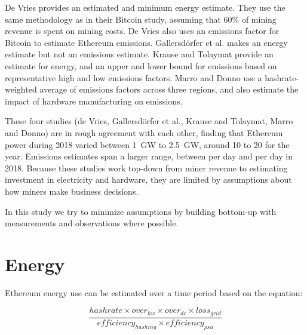 De Vries provides an estimated and minimum energy estimate. They use the same methodology as in their Bitcoin study, assuming that 60\% of mining revenue is spent on mining costs. De Vries also uses an emissions factor for Bitcoin to estimate Ethereum emissions. Gallersdörfer et al. makes an energy estimate but not an emissions estimate. Krause and Tolaymat provide an estimate for energy, and an upper and lower bound for emissions based on representative high and low emissions factors. Marro and Donno use a hashrate-weighted average of emissions factors across three regions, and also estimate the impact of hardware manufacturing on emissions.

These four studies (de Vries, Gallersdörfer et al., Krause and Tolaymat, Marro and Donno) are in rough agreement with each other, finding that Ethereum power during 2018 varied between \SI{1}{\giga\watt} to \SI{2.5}{\giga\watt}, around \SI{10}{\TWh} to \SI{20}{\TWh} for the year. Emissions estimates span a larger range, between  per day and  per day in 2018. Because these studies work top-down from miner revenue to estimating investment in electricity and hardware, they are limited by assumptions about how miners make business decisions.

In this study we try to minimize assumptions by building bottom-up with measurements and observations where possible.

\section{Energy}

Ethereum energy use can be estimated over a time period based on the equation:

\newcommand{\hashrate}{\mathit{hashrate}}
\newcommand{\hardwareoverhead}{\mathit{over}_\mathit{hw}}
\newcommand{\gridloss}{\mathit{loss}_\mathit{grid}}
\newcommand{\hashingefficiency}{\mathit{efficiency}_\mathit{hashing}}
\newcommand{\datacenteroverhead}{\mathit{over}_\mathit{dc}}
\newcommand{\powersupplyefficiency}{\mathit{efficiency}_\mathit{psu}}

\begin{equation} \label{eq:1}
\frac{\hashrate \times \hardwareoverhead \times \datacenteroverhead \times \gridloss}{\hashingefficiency \times \powersupplyefficiency}
\end{equation}

